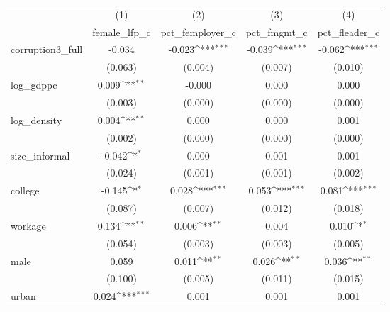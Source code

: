 {
\def\sym#1{\ifmmode^{#1}\else\(^{#1}\)\fi}
\begin{tabular}{l*{4}{c}}
\hline\hline
            &\multicolumn{1}{c}{(1)}&\multicolumn{1}{c}{(2)}&\multicolumn{1}{c}{(3)}&\multicolumn{1}{c}{(4)}\\
            &\multicolumn{1}{c}{female\_lfp\_c}&\multicolumn{1}{c}{pct\_femployer\_c}&\multicolumn{1}{c}{pct\_fmgmt\_c}&\multicolumn{1}{c}{pct\_fleader\_c}\\
\hline
corruption3\_full&      -0.034         &      -0.023\sym{***}&      -0.039\sym{***}&      -0.062\sym{***}\\
            &     (0.063)         &     (0.004)         &     (0.007)         &     (0.010)         \\
[1em]
log\_gdppc   &       0.009\sym{**} &      -0.000         &       0.000         &       0.000         \\
            &     (0.003)         &     (0.000)         &     (0.000)         &     (0.000)         \\
[1em]
log\_density &       0.004\sym{**} &       0.000         &       0.000         &       0.001         \\
            &     (0.002)         &     (0.000)         &     (0.000)         &     (0.000)         \\
[1em]
size\_informal&      -0.042\sym{*}  &       0.000         &       0.001         &       0.001         \\
            &     (0.024)         &     (0.001)         &     (0.001)         &     (0.002)         \\
[1em]
college     &      -0.145\sym{*}  &       0.028\sym{***}&       0.053\sym{***}&       0.081\sym{***}\\
            &     (0.087)         &     (0.007)         &     (0.012)         &     (0.018)         \\
[1em]
workage     &       0.134\sym{**} &       0.006\sym{**} &       0.004         &       0.010\sym{*}  \\
            &     (0.054)         &     (0.003)         &     (0.003)         &     (0.005)         \\
[1em]
male        &       0.059         &       0.011\sym{**} &       0.026\sym{**} &       0.036\sym{**} \\
            &     (0.100)         &     (0.005)         &     (0.011)         &     (0.015)         \\
[1em]
urban       &       0.024\sym{***}&       0.001         &       0.001         &       0.001         \\

\end{tabular}}
